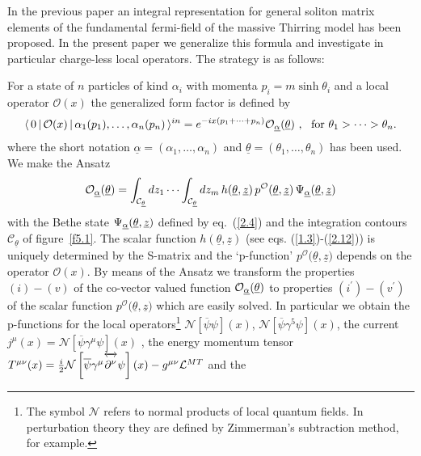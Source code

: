 \documentclass[a4paper,a4paper]{article}
\begin{document}
In the previous paper \cite{BFKZ} an integral representation for general
soliton matrix elements of the fundamental fermi-field of the massive
Thirring model has been proposed. In the present paper we generalize this
formula and investigate in particular charge-less local operators. The
strategy is as follows:

For a state of $n$ particles of kind $\alpha _{i}$ with momenta $%
p_{i}=m\sinh \theta _{i}$ and a local operator $\mathcal{O}(x)$ the
generalized form factor is defined by 
\[
\langle \,0\,|\,\mathcal{O}(x)\,|\,\alpha _{1}(p_{1}),\dots ,\alpha
_{n}(p_{n})\,\rangle ^{in}=e^{-ix(p_{1}+\cdots +p_{n})}\mathcal{O}_{%
\underline{\alpha }}(\underline{\theta })~,~~\mathrm{for}~\theta _{1}>\dots
>\theta _{n}. 
\]
where the short notation $\underline{\alpha }=(\alpha _{1},\dots ,\alpha
_{n})$ and $\underline{\theta }=(\theta _{1},\dots ,\theta _{n})$ has been
used. We make the Ansatz 
\[
\mathcal{O}_{\underline{\alpha }}(\underline{\theta })=\int_{\mathcal{C}_{%
\underline{\theta }}}dz_{1}\cdots \int_{\mathcal{C}_{\underline{\theta }%
}}dz_{m}\,h(\underline{\theta },{\underline{z}})\,p^{\mathcal{O}}(\underline{%
\theta },{\underline{z}})\,\Psi _{\underline{\alpha }}(\underline{\theta },{%
\underline{z}}) 
\]
with the Bethe state $\Psi _{\underline{\alpha }}(\underline{\theta },{%
\underline{z}})$ defined by eq.~(\ref{2.4}) and the integration contours $%
\mathcal{C}_{\underline{\theta }}$ of figure~\ref{f5.1}. The scalar function 
$h(\underline{\theta },{\underline{z}})$ (see eqs. (\ref{1.3})-(\ref{2.12}))
is uniquely determined by the S-matrix and the `p-function' $p^{\mathcal{O}}(%
\underline{\theta },{\underline{z})}$ depends on the operator $\mathcal{O}%
(x) $. By means of the Ansatz we transform the properties $(i)-(v)$ of the
co-vector valued function $\mathcal{O}_{\underline{\alpha }}(\underline{%
\theta })$ to properties $(i^{\prime })-(v^{\prime })$ of the scalar
function $p^{\mathcal{O}}(\underline{\theta },{\underline{z})}$ which are
easily solved. In particular we obtain the p-functions for the local
operators\footnote{%
The symbol $\mathcal{N}$ refers to normal products of local quantum fields.
In perturbation theory they are defined by Zimmerman's \cite{Zi} subtraction
method, for example.} $\mathcal{N}\left[ \overline{\psi }\psi \right] (x)$, $%
\mathcal{N}\left[ \overline{\psi }\gamma ^{5}\psi \right] (x)$, the current $%
j^{\mu }(x)=\mathcal{N}\left[ \overline{\psi }\gamma ^{\mu }\psi \right] (x)$%
, the energy momentum tensor $T^{\mu \nu }(x)=\tfrac{i}{2}\mathcal{N}\left[ 
\overline{\psi }\gamma ^{\mu }\overleftrightarrow{\partial ^{\nu }\rule%
{0in}{0.14in}}\psi \right] (x)-g^{\mu \nu }\mathcal{L}^{MT}$ and the
\end{document}
